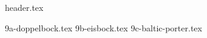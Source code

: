 \clearpage
{}
\divisorLine

{header.tex}

\begin{multicols}{2}

{9a-doppelbock.tex}
{9b-eisbock.tex}
{9c-baltic-porter.tex}

\end{multicols}